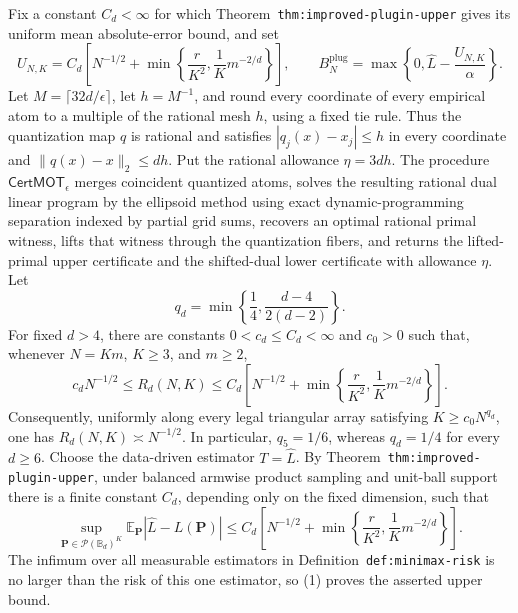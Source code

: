 Fix a constant \(C_d<\infty\) for which Theorem~\texttt{thm:improved-plugin-upper} gives its uniform mean absolute-error bound, and set
\[
U_{N,K}=C_d\left[N^{-1/2}+\min\left\{\frac r{K^2},\frac1K m^{-2/d}\right\}\right],
\qquad
B_N^{\mathrm{plug}}=\max\left\{0,\widehat L-\frac{U_{N,K}}{\alpha}\right\}.
\]
Let \(M=\lceil32d/\epsilon\rceil\), let \(h=M^{-1}\), and round every coordinate of every empirical atom to a multiple of the rational mesh \(h\), using a fixed tie rule. Thus the quantization map \(q\) is rational and satisfies \(|q_j(x)-x_j|\le h\) in every coordinate and \(\|q(x)-x\|_2\le dh\). Put the rational allowance \(\eta=3dh\). The procedure \(\mathsf{CertMOT}_\epsilon\) merges coincident quantized atoms, solves the resulting rational dual linear program by the ellipsoid method using exact dynamic-programming separation indexed by partial grid sums, recovers an optimal rational primal witness, lifts that witness through the quantization fibers, and returns the lifted-primal upper certificate and the shifted-dual lower certificate with allowance \(\eta\).
Let
\[
q_d=\min\left\{\frac14,\frac{d-4}{2(d-2)}\right\}.
\]
For fixed \(d>4\), there are constants \(0<c_d\le C_d<\infty\) and \(c_0>0\) such that, whenever \(N=Km\), \(K\ge3\), and \(m\ge2\),
\[
c_dN^{-1/2}\le R_d(N,K)
\le C_d\left[N^{-1/2}+\min\left\{\frac r{K^2},\frac1K m^{-2/d}\right\}\right].
\]
Consequently, uniformly along every legal triangular array satisfying \(K\ge c_0N^{q_d}\), one has \(R_d(N,K)\asymp N^{-1/2}\). In particular, \(q_5=1/6\), whereas \(q_d=1/4\) for every \(d\ge6\).
Choose the data-driven estimator \(T=\widehat L\). By Theorem~\texttt{thm:improved-plugin-upper}, under balanced armwise product sampling and unit-ball support there is a finite constant \(C_d\), depending only on the fixed dimension, such that
\[
\sup_{\mathbf P\in\mathcal P(\mathbb B_d)^K}
\mathbb E_{\mathbf P}|\widehat L-L(\mathbf P)|
\le C_d\left[N^{-1/2}+\min\left\{\frac r{K^2},\frac1K m^{-2/d}\right\}\right].
\tag{1}
\]
The infimum over all measurable estimators in Definition~\texttt{def:minimax-risk} is no larger than the risk of this one estimator, so (1) proves the asserted upper bound.

